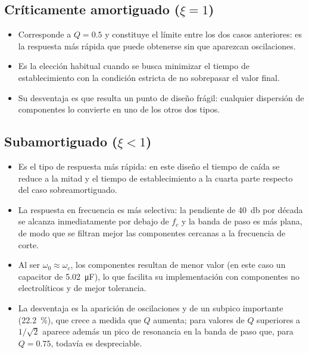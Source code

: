 \subsection{Críticamente amortiguado ($\xi = 1$)}

\begin{itemize}
  \item Corresponde a $Q = \num{0.5}$ y constituye el límite entre los dos casos anteriores: es la respuesta
        más rápida que puede obtenerse sin que aparezcan oscilaciones.
  \item Es la elección habitual cuando se busca minimizar el tiempo de establecimiento con la condición
        estricta de no sobrepasar el valor final.
  \item Su desventaja es que resulta un punto de diseño frágil: cualquier dispersión de componentes lo
        convierte en uno de los otros dos tipos.
\end{itemize}

\subsection{Subamortiguado ($\xi < 1$)}

\begin{itemize}
  \item Es el tipo de respuesta más rápida: en este diseño el tiempo de caída se reduce a la mitad y el
        tiempo de establecimiento a la cuarta parte respecto del caso sobreamortiguado.
  \item La respuesta en frecuencia es más selectiva: la pendiente de \qty{40}{\decibel} por década se
        alcanza inmediatamente por debajo de $f_c$ y la banda de paso es más plana, de modo que se filtran
        mejor las componentes cercanas a la frecuencia de corte.
  \item Al ser $\omega_0 \approx \omega_c$, los componentes resultan de menor valor (en este caso un
        capacitor de \qty{5.02}{\micro\farad}), lo que facilita su implementación con componentes no
        electrolíticos y de mejor tolerancia.
  \item La desventaja es la aparición de oscilaciones y de un subpico importante (\qty{22.2}{\percent}), que
        crece a medida que $Q$ aumenta; para valores de $Q$ superiores a $1/\sqrt{2}$ aparece además un pico
        de resonancia en la banda de paso que, para $Q = \num{0.75}$, todavía es despreciable.
\end{itemize}
